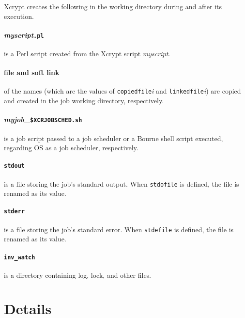 \documentclass[a4paper,10pt]{report}
\begin{document}
Xcrypt creates the following in the working directory
during and after its execution.

\subsection*{\textit{myscript}\texttt{.pl}}

is a Perl script created from the Xcrypt script \textit{myscript}.

\subsection*{file and soft link}

of the names (which are the values of \texttt{copiedfile}\textit{i}
and \texttt{linkedfile}\textit{i}) are copied and created in the job
working directory, respectively.
\fi

\subsection*{\textit{myjob}\_\texttt{\$XCRJOBSCHED.sh}}

is a job script passed to a job scheduler or a Bourne shell script
executed, regarding OS as a job scheduler, respectively.

\subsection*{\texttt{stdout}}

is a file storing the job's standard output.  When \texttt{stdofile}
is defined, the file is renamed as its value.

\subsection*{\texttt{stderr}}

is a file storing the job's standard error.  When \texttt{stdefile}
is defined, the file is renamed as its value.

\subsection*{\texttt{inv\_watch}}

is a directory containing log, lock, and other files.

\part{Details}
\end{document}

